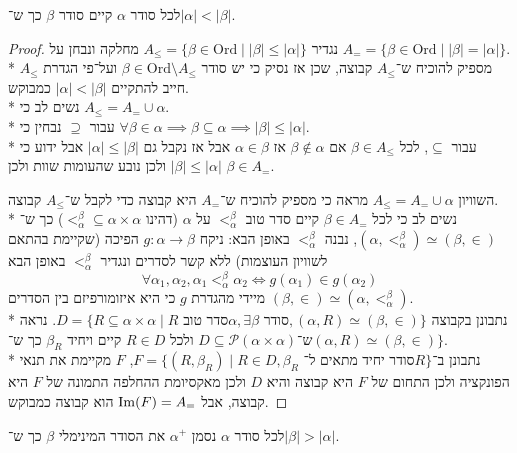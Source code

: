 \begin{theorem}
	לכל סודר $\alpha$ קיים סודר $\beta$ כך ש־$|\alpha| < |\beta|$.
\end{theorem}
\begin{proof}
	נגדיר $A_\le = \{ \beta \in \text{Ord} \mid |\beta| \le |\alpha| \}$ מחלקה ונבחן על $A_= = \{ \beta \in \text{Ord} \mid |\beta| = |\alpha| \}$. \\*
	מספיק להוכיח ש־$A_\le$ קבוצה, שכן אז נסיק כי יש סודר $\beta \in \text{Ord} \setminus A_\le$ ועל־פי הגדרת $A_\le$ חייב להתקיים $|\alpha| < |\beta|$ כמבוקש. \\*
	נשים לב כי $A_\le = A_= \cup \alpha$. \\*
	עבור $\supseteq$ נבחין כי $\forall \beta \in \alpha \implies \beta \subseteq \alpha \implies |\beta| \le |\alpha|$. \\*
	עבור $\subseteq$, לכל $\beta \in A_\le$ אם $\beta \notin \alpha$ אז $\alpha \in \beta$ אבל אז נקבל גם $|\alpha| \le |\beta|$ אבל ידוע כי $|\beta| \le |\alpha|$ ולכן נובע שהעומות שוות ולכן $\beta \in A_=$.

	השוויון $A_\le = A_= \cup \alpha$ מראה כי מספיק להוכיח ש־$A_=$ היא קבוצה כדי לקבל ש־$A_\le$ קבוצה. \\*
	נשים לב כי לכל $\beta \in A_=$ קיים סדר טוב $<_\alpha^\beta$ על $\alpha$ (דהינו $<_\alpha^\beta \subseteq \alpha \times \alpha$) כך ש־$(\alpha, <_\alpha^\beta) \simeq (\beta, \in)$,
	נבנה $<_\alpha^\beta$ באופן הבא:
	ניקח $g : \alpha \to \beta$ הפיכה (שקיימת בהתאם לשוויון העוצמות) ללא קשר לסדרים ונגדיר $<_\alpha^\beta$ באופן הבא
	\[
		\forall \alpha_1, \alpha_2, \alpha_1 <_\alpha^\beta \alpha_2 \iff g(\alpha_1) \in g(\alpha_2)
	\]
	מיידי מהגדרת $g$ כי היא איזומורפיזם בין הסדרים $(\beta, \in) \simeq (\alpha, <_\alpha^\beta)$. \\*
	נתבונן בקבוצה $D = \{ R \subseteq \alpha \times \alpha \mid R \text{ סדר טוב} \alpha, \exists \beta \text{ סודר}, (\alpha, R) \simeq (\beta, \in) \}$.
	נראה ש־$D \subseteq \mathcal{P}(\alpha \times \alpha)$ ולכל $R \in D$ קיים ויחיד $\beta_R$ כך ש־$(\alpha, R) \simeq (\beta, \in) \}$. \\*
	נתבונן ב־$F = \{ (R, \beta_R) \mid R \in D, \text{$\beta_R$ סודר יחיד מתאים ל־$R$}\}$,
	$F$ מקיימת את תנאי הפונקציה ולכן התחום של $F$ היא קבוצה והיא $D$ ולכן מאקסיומת ההחלפה התמונה של $F$ היא קבוצה, אבל $\operatorname{Im}(F) = A_=$ הוא קבוצה כמבוקש.
\end{proof}
\begin{notation}
	לכל סודר $\alpha$ נסמן $\alpha^+$ את הסודר המינימלי $\beta$ כך ש־$|\beta| > |\alpha|$.
\end{notation}
